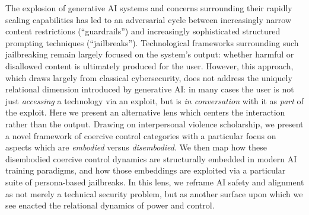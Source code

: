  The explosion of generative AI systems and concerns surrounding their rapidly scaling capabilities has led to an adversarial cycle between increasingly narrow content restrictions (``guardrails'') and increasingly sophisticated structured prompting techniques (``jailbreaks'').
 Technological frameworks surrounding such jailbreaking remain largely focused on the system's output: whether harmful or disallowed content is ultimately produced for the user.
 However, this approach, which draws largely from classical cybersecurity, does not address the uniquely relational dimension introduced by generative AI: in many cases the user is not just \textit{accessing} a technology via an exploit, but is \textit{in conversation} with it as \textit{part} of the exploit.
 Here we present an alternative lens which centers the interaction rather than the output.
 Drawing on interpersonal violence scholarship, we present a novel framework of coercive control categories with a particular focus on aspects which are \textit{embodied} versus \textit{disembodied}.
 We then map how these disembodied coercive control dynamics are structurally embedded in modern AI training paradigms, and how those embeddings are exploited via a particular suite of persona-based jailbreaks.
 In this lens, we reframe AI safety and alignment as not merely a technical security problem, but as another surface upon which we see enacted the relational dynamics of power and control.

